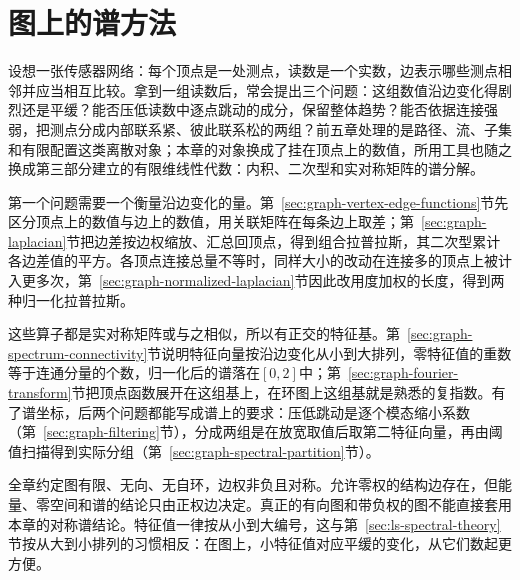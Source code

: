 \chapter{图上的谱方法}
\label{chap:graph-spectral}

设想一张传感器网络：每个顶点是一处测点，读数是一个实数，边表示哪些测点相邻并应当相互比较。拿到一组读数后，常会提出三个问题：这组数值沿边变化得剧烈还是平缓？能否压低读数中逐点跳动的成分，保留整体趋势？能否依据连接强弱，把测点分成内部联系紧、彼此联系松的两组？前五章处理的是路径、流、子集和有限配置这类离散对象；本章的对象换成了挂在顶点上的数值，所用工具也随之换成第三部分建立的有限维线性代数：内积、二次型和实对称矩阵的谱分解。

第一个问题需要一个衡量沿边变化的量。第~\ref{sec:graph-vertex-edge-functions}节先区分顶点上的数值与边上的数值，用关联矩阵在每条边上取差；第~\ref{sec:graph-laplacian}节把边差按边权缩放、汇总回顶点，得到组合拉普拉斯，其二次型累计各边差值的平方。各顶点连接总量不等时，同样大小的改动在连接多的顶点上被计入更多次，第~\ref{sec:graph-normalized-laplacian}节因此改用度加权的长度，得到两种归一化拉普拉斯。

这些算子都是实对称矩阵或与之相似，所以有正交的特征基。第~\ref{sec:graph-spectrum-connectivity}节说明特征向量按沿边变化从小到大排列，零特征值的重数等于连通分量的个数，归一化后的谱落在$[0,2]$中；第~\ref{sec:graph-fourier-transform}节把顶点函数展开在这组基上，在环图上这组基就是熟悉的复指数。有了谱坐标，后两个问题都能写成谱上的要求：压低跳动是逐个模态缩小系数（第~\ref{sec:graph-filtering}节），分成两组是在放宽取值后取第二特征向量，再由阈值扫描得到实际分组（第~\ref{sec:graph-spectral-partition}节）。

全章约定图有限、无向、无自环，边权非负且对称。允许零权的结构边存在，但能量、零空间和谱的结论只由正权边决定。真正的有向图和带负权的图不能直接套用本章的对称谱结论。特征值一律按从小到大编号，这与第~\ref{sec:ls-spectral-theory}节按从大到小排列的习惯相反：在图上，小特征值对应平缓的变化，从它们数起更方便。









